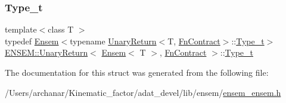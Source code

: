 \subsubsection{\texorpdfstring{Type\_t}{Type\_t}\hspace{0.1cm}{\footnotesize\ttfamily [2/2]}}
{\footnotesize\ttfamily template$<$class T $>$ \\
typedef \mbox{\hyperlink{classENSEM_1_1Ensem}{Ensem}}$<$typename \mbox{\hyperlink{structENSEM_1_1UnaryReturn}{Unary\+Return}}$<$T, \mbox{\hyperlink{structENSEM_1_1FnContract}{Fn\+Contract}}$>$\+::\mbox{\hyperlink{structENSEM_1_1UnaryReturn_3_01Ensem_3_01T_01_4_00_01FnContract_01_4_a3be6c264185868ff0356a15a3b802b83}{Type\+\_\+t}}$>$ \mbox{\hyperlink{structENSEM_1_1UnaryReturn}{E\+N\+S\+E\+M\+::\+Unary\+Return}}$<$ \mbox{\hyperlink{classENSEM_1_1Ensem}{Ensem}}$<$ T $>$, \mbox{\hyperlink{structENSEM_1_1FnContract}{Fn\+Contract}} $>$\+::\mbox{\hyperlink{structENSEM_1_1UnaryReturn_3_01Ensem_3_01T_01_4_00_01FnContract_01_4_a3be6c264185868ff0356a15a3b802b83}{Type\+\_\+t}}}



The documentation for this struct was generated from the following file\+:\begin{DoxyCompactItemize}
\item 
/\+Users/archanar/\+Kinematic\+\_\+factor/adat\+\_\+devel/lib/ensem/\mbox{\hyperlink{lib_2ensem_2ensem__ensem_8h}{ensem\+\_\+ensem.\+h}}\end{DoxyCompactItemize}
